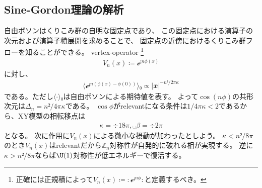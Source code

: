 \documentclass[12pt]{ltjsarticle}
\begin{document}


\subsection*{Sine-Gordon理論の解析}
自由ボソンはくりこみ群の自明な固定点であり、
この固定点における演算子の次元および演算子積展開を求めることで、
固定点の近傍におけるくりこみ群フローを知ることができる。
vertex-operator \footnote{
    正確には正規積によって$V_n(x) ≔ {:ℯ^{¡nϕ}:}$と定義するべき。
}
\begin{align}
    V_n(x) ≔ ℯ^{¡nϕ(x)}
\end{align}
に対し、
\begin{align}
    ⟨ℯ^{¡n(ϕ(x)-ϕ(0))}⟩₀
    ∝ |𝒙|^{-n²/2πκ}
\end{align}
である。ただし$⟨⋅⟩₀$は自由ボソンによる期待値を表す。
よって$\cos(nϕ)$の共形次元は$Δ_n = n²/4πκ$である。
$\cos ϕ $がrelevantになる条件は$1/4πκ < 2$であるから、XY模型の相転移点は
\begin{align}
    κ = ÷{1}{8π},␣ β = ÷{2}{π}
\end{align}
となる。
次に作用に$V_n(x)$による微小な摂動が加わったとしよう。
$κ < n²/8π$のとき$V_n(x)$はrelevantだから$ℤ_n$対称性が自発的に破れる相が実現する。
逆に$κ > n²/8π$ならば$\U(1)$対称性が低エネルギーで復活する。
\end{document}
